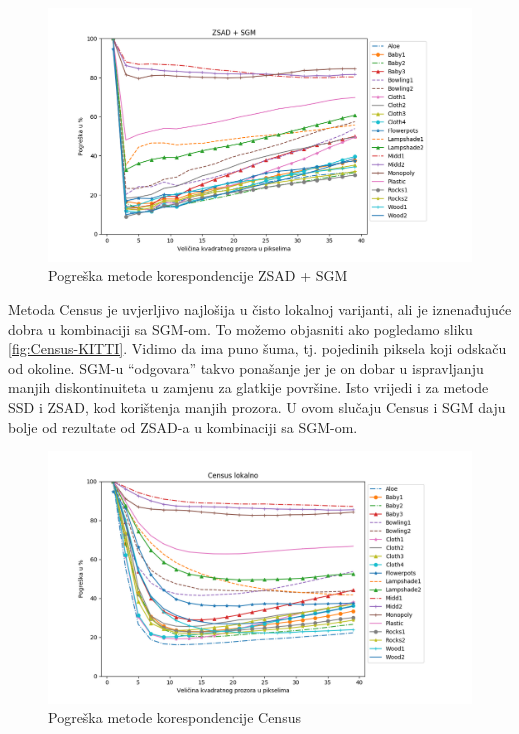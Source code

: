 \documentclass[utf8, zavrsni, numeric]{fer}
\begin{document}
\begin{figure}[H]
  \centering
  \includegraphics[width=13cm]{img/ZSAD_sgm_middlebury.png}
  \caption{Pogreška metode korespondencije ZSAD + SGM}
  \label{fig:ZSAD-sgm-error}
\end{figure}

Metoda Census je uvjerljivo najlošija u čisto lokalnoj varijanti, ali je iznenađujuće dobra
u kombinaciji sa SGM-om. To možemo objasniti ako pogledamo sliku \ref{fig:Census-KITTI}.
Vidimo da ima puno šuma, tj. pojedinih piksela koji odskaču od okoline. SGM-u ``odgovara''
takvo ponašanje jer je on dobar u ispravljanju manjih diskontinuiteta u zamjenu za glatkije
površine. Isto vrijedi i za metode SSD i ZSAD, kod korištenja manjih prozora. U ovom
slučaju Census i SGM daju bolje od rezultate od ZSAD-a u kombinaciji sa SGM-om.

\begin{figure}[H]
  \centering
  \includegraphics[width=13cm]{img/Census_lokalno_middlebury.png}
  \caption{Pogreška metode korespondencije Census}
  \label{fig:Census-error}
\end{figure}
\end{document}
